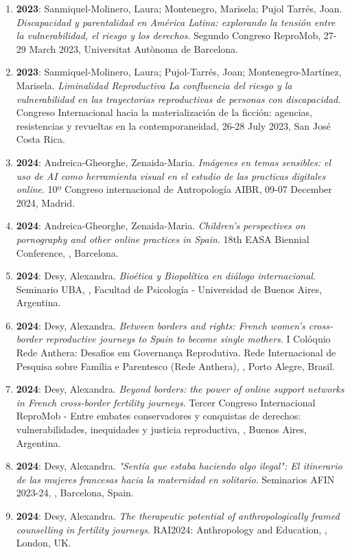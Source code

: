 \begin{enumerate}
\item {\bf 2023}: Sanmiquel-Molinero, Laura; Montenegro, Marisela; Pujol Tarrés, Joan. {\it Discapacidad y parentalidad en América Latina: explorando la tensión entre la vulnerabilidad, el riesgo y los derechos}. Segundo Congreso ReproMob, 27-29 March 2023, Universitat Autònoma de Barcelona.\filbreak
\item {\bf 2023}: Sanmiquel-Molinero, Laura; Pujol-Tarrés, Joan; Montenegro-Martínez, Marisela. {\it Liminalidad Reproductiva La confluencia del riesgo y la vulnerabilidad en las trayectorias reproductivas de personas con discapacidad}. Congreso Internacional hacia la materialización de la ficción: agencias, resistencias y revueltas en la contemporaneidad, 26-28 July 2023, San José Costa Rica.\filbreak
\item {\bf 2024}: Andreica-Gheorghe, Zenaida-Maria. {\it Imágenes en temas sensibles: el uso de AI como herramienta visual en el estudio de las practicas digitales online}. 10º Congreso internacional de Antropología AIBR, 09-07 December 2024, Madrid.\filbreak
\item {\bf 2024}: Andreica-Gheorghe, Zenaida-Maria. {\it Children’s perspectives on pornography and other online practices in Spain}. 18th EASA Biennial Conference, , Barcelona.\filbreak
\item {\bf 2024}: Desy, Alexandra. {\it Bioética y Biopolítica en diálogo internacional}. Seminario UBA, , Facultad de Psicología - Universidad de Buenos Aires, Argentina.\filbreak
\item {\bf 2024}: Desy, Alexandra. {\it Between borders and rights: French women's cross-border reproductive
journeys to Spain to become single mothers}. I Colóquio Rede Anthera: Desafios em Governança Reprodutiva. Rede Internacional de Pesquisa sobre Família e Parentesco
(Rede Anthera), , Porto Alegre, Brasil.\filbreak
\item {\bf 2024}: Desy, Alexandra. {\it Beyond borders: the power of online support networks in French cross-border fertility journeys}. Tercer Congreso Internacional ReproMob - Entre embates conservadores y conquistas de derechos: vulnerabilidades, inequidades y justicia reproductiva, , Buenos Aires, Argentina.\filbreak
\item {\bf 2024}: Desy, Alexandra. {\it "Sentía que estaba haciendo algo ilegal": El itinerario de las mujeres francesas hacia la maternidad en solitario}. Seminarios AFIN 2023-24, , Barcelona, Spain.\filbreak
\item {\bf 2024}: Desy, Alexandra. {\it The therapeutic potential of anthropologically framed counselling in fertility journeys}. RAI2024: Anthropology and Education, , London, UK.\filbreak

\end{enumerate}
